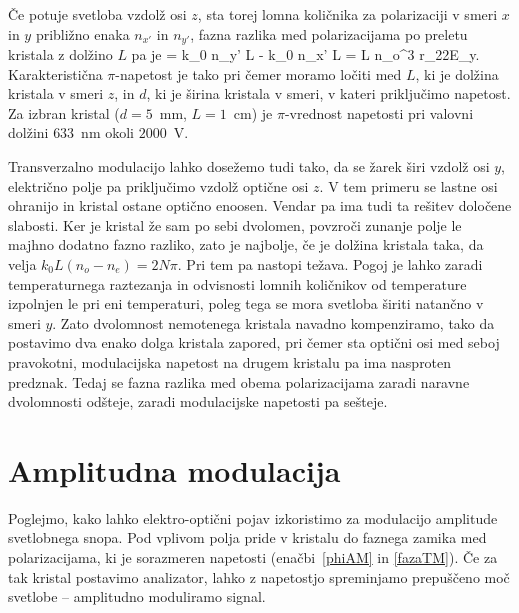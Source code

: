 Če potuje svetloba vzdolž osi $z$, sta torej lomna količnika za 
polarizaciji v smeri $x$ in $y$ približno enaka $n_{x'}$ in $n_{y'}$, fazna razlika med 
polarizacijama po preletu kristala z dolžino $L$ pa je 
\beq
\Delta \phi = k_0 n_{y'} L - k_0 n_{x'} L = L 
n_o^3 r_{22}E_y.
\label{fazaTM}
\eeq
Karakteristična $\pi$-napetost je tako
pri čemer moramo ločiti med $L$, ki je dolžina kristala v smeri $z$, in $d$, ki je  
širina kristala v smeri, v kateri priključimo napetost. 
Za izbran kristal ($d=5$~mm, $L=1$~cm) je $\pi$-vrednost 
napetosti pri valovni dolžini $633$~nm okoli $2000$~V. 

\begin{remark}
Transverzalno modulacijo lahko dosežemo tudi tako, da se žarek širi vzdolž 
osi $y$, električno polje pa priključimo vzdolž optične osi $z$.
V tem primeru se lastne osi ohranijo in kristal ostane optično enoosen. Vendar 
pa ima tudi ta rešitev določene slabosti. Ker je kristal že sam po sebi dvolomen, 
povzroči zunanje polje le majhno dodatno fazno razliko, zato je najbolje, če je dolžina 
kristala taka, da velja $k_{0}L(n_{o}-n_{e})=2N\pi$. Pri tem pa nastopi težava. 
Pogoj je lahko zaradi temperaturnega raztezanja in odvisnosti lomnih količnikov od temperature
izpolnjen le pri eni temperaturi, poleg tega se mora svetloba širiti natančno v smeri $y$.
Zato dvolomnost nemotenega kristala navadno kompenziramo, tako da postavimo 
dva enako dolga kristala zapored, pri čemer sta optični
osi med seboj pravokotni, modulacijska napetost na drugem kristalu pa ima
nasproten predznak. Tedaj se fazna razlika med obema polarizacijama zaradi 
naravne dvolomnosti odšteje, zaradi modulacijske napetosti pa sešteje.
\end{remark}

\section{Amplitudna modulacija}
\label{chap:ampmod}
Poglejmo, kako lahko elektro-optični pojav izkoristimo za modulacijo
amplitude svetlobnega snopa. Pod vplivom polja pride v kristalu do
faznega zamika med polarizacijama, ki je sorazmeren napetosti 
(enačbi~\ref{phiAM} in \ref{fazaTM}).
Če za tak kristal postavimo analizator, lahko z napetostjo spreminjamo 
prepuščeno moč svetlobe -- amplitudno moduliramo signal.

